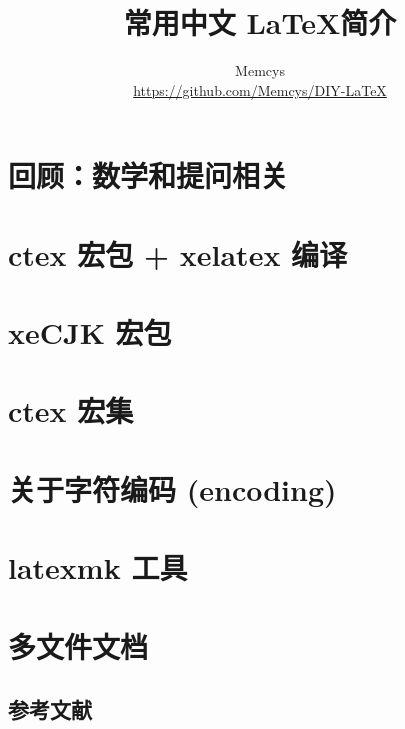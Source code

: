 \documentclass{ctexart}
\title{常用中文 \LaTeX 简介}
\author{Memcys \\ \url{https://github.com/Memcys/DIY-LaTeX}}
\begin{document}
\maketitle

\setcounter{section}{-1}

\section{回顾：数学和提问相关}


\tableofcontents

\section{ctex 宏包 + xelatex 编译}


\section{xeCJK 宏包}


\section{ctex 宏集}


\appendix
\section{关于字符编码 (encoding)}


\section{latexmk 工具}\label{ap:latexmk}


\section{多文件文档}


\listoftables
\lstlistoflistings
{}\label{lstof:exercises}

\subsection*{参考文献}
\printbibliography[heading=none]
\end{document}
